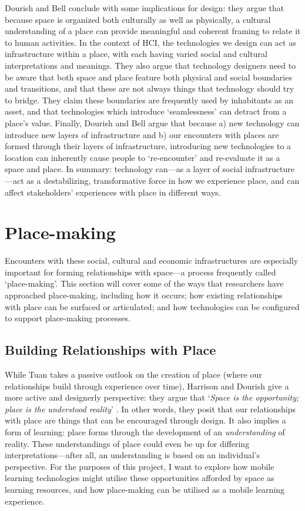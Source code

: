 Dourish and Bell conclude with some implications for design: they argue that because space is organized both culturally as well as physically, a cultural understanding of a place can provide meaningful and coherent framing to relate it to human activities. In the context of HCI, the technologies we design can act as infrastructure within a place, with each having varied social and cultural interpretations and meanings. They also argue that technology designers need to be aware that both space and place feature both physical and social boundaries and transitions, and that these are not always things that technology should try to bridge. They claim these boundaries are frequently used by inhabitants as an asset, and that technologies which introduce `seamlessness' can detract from a place's value. Finally, Dourish and Bell argue that because a) new technology can introduce new layers of infrastructure and b) our encounters with places are formed through their layers of infrastructure, introducing new technologies to a location can inherently cause people to `re-encounter' and re-evaluate it as a space and place. In summary: technology can---as a layer of social infrastructure---act as a destabilizing, transformative force in how we experience place, and can affect stakeholders' experiences with place in different ways.

\section{Place-making}

Encounters with these social, cultural and economic infrastructures are especially important for forming relationships with space---a process frequently called `place-making'. This section will cover some of the ways that researchers have approached place-making, including how it occurs; how existing relationships with place can be surfaced or articulated; and how technologies can be configured to support place-making processes.

\subsection{Building Relationships with Place}
While Tuan takes a passive outlook on the creation of place (where our relationships build through experience over time), Harrison and Dourish give a more active and designerly perspective: they argue that `\textit{Space is the opportunity; place is the understood reality}' \citep{harrison1996}. In other words, they posit that our relationships with place are things that can be encouraged through design. It also implies a form of learning: place forms through the development of an \textit{understanding} of reality. These understandings of place could even be up for differing interpretations---after all, an understanding is based on an individual's perspective. For the purposes of this project, I want to explore how mobile learning technologies might utilise these opportunities afforded by space as learning resources, and how place-making can be utilised as a mobile learning experience.

